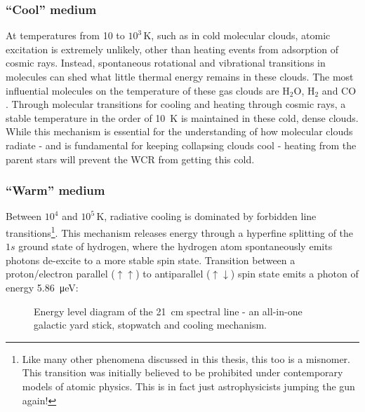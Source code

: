 \subsubsection{``Cool'' medium}

At temperatures from 10 to $10^3 \, \si{\kelvin}$, such as in cold molecular clouds, atomic excitation is extremely unlikely, other than heating events from adsorption of cosmic rays.
Instead, spontaneous rotational and vibrational transitions in molecules can shed what little thermal energy remains in these clouds.
The most influential molecules on the temperature of these gas clouds are $\text{H}_2 \text{O}$, $\text{H}_2$ and $\text{CO}$
\parencite{neufeldRadiativeCoolingWarm1993,neufeldThermalBalanceDense1995}.
Through molecular transitions for cooling and heating through cosmic rays, a stable temperature in the order of \SI{10}{\kelvin} is maintained in these cold, dense clouds.
While this mechanism is essential for the understanding of how molecular clouds radiate - and is fundamental for keeping collapsing clouds cool - heating from the parent stars will prevent the WCR from getting this cold.

\subsubsection{``Warm'' medium}

Between $10^4$ and $10^5 \, \si{\kelvin}$, radiative cooling is dominated by forbidden line transitions\footnote{Like many other phenomena discussed in this thesis, this too is a misnomer. This transition was initially believed to be prohibited under contemporary models of atomic physics. This is in fact just astrophysicists jumping the gun again!}.
This mechanism releases energy through a hyperfine splitting of the $1s$ ground state of hydrogen, where the hydrogen atom spontaneously emits photons de-excite to a more stable spin state.
Transition between a proton/electron parallel ($\uparrow\uparrow$) to antiparallel ($\uparrow\downarrow$) spin state emits a photon of energy \SI{5.86}{\micro\electronvolt}:

\begin{figure}[H]
  \caption[The \SI{21}{cm} spectral line]{Energy level diagram of the \SI{21}{cm} spectral line - an all-in-one galactic yard stick, stopwatch and cooling mechanism.}
  \label{fig:quiver-h}
\end{figure}

